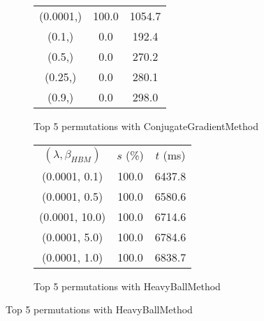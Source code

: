 \begin{figure}[H]
\begin{subfigure}[ht]{.5\textwidth}
\begin{tabular}{|c|c|c|}
\hline
(0.0001,) & 100.0 & 1054.7 \\
(0.1,) & 0.0 & 192.4 \\
(0.5,) & 0.0 & 270.2 \\
(0.25,) & 0.0 & 280.1 \\
(0.9,) & 0.0 & 298.0 \\
\hline
\end{tabular}
\caption{Top 5 permutations with ConjugateGradientMethod}
\label{subfig:param_comp_MatrixSquareSum_ConjugateGradientMethod_ConstantSearch}
\end{subfigure}
\hfill
\begin{subfigure}[ht]{.5\textwidth}
\begin{tabular}{|c|c|c|}
\hline
\rowcolor{gray!25}
\multicolumn{3}{|c|}{HeavyBallMethod} \\
\hline
\rowcolor{gray!25}
$(\lambda,\beta_{HBM})$ & $s$ (\%) & $t$ (ms) \\
\hline
(0.0001, 0.1) & 100.0 & 6437.8 \\
(0.0001, 0.5) & 100.0 & 6580.6 \\
(0.0001, 10.0) & 100.0 & 6714.6 \\
(0.0001, 5.0) & 100.0 & 6784.6 \\
(0.0001, 1.0) & 100.0 & 6838.7 \\
\hline
\end{tabular}
\caption{Top 5 permutations with HeavyBallMethod}
\label{subfig:param_comp_MatrixSquareSum_HeavyBallMethod_ConstantSearch}
\end{subfigure}
\end{figure}

